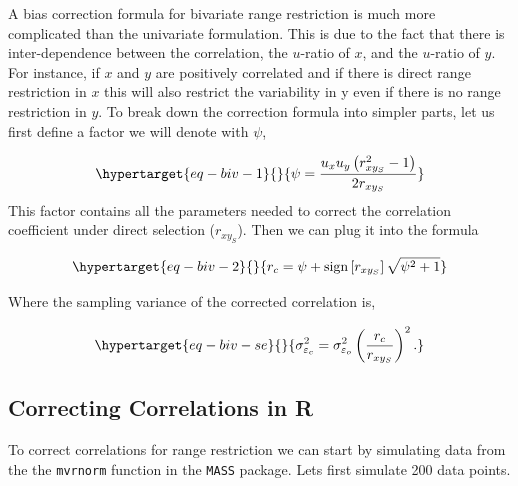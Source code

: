 \documentclass[
  letterpaper,
  DIV=11,
  numbers=noendperiod]{scrreprt}
\begin{document}
A bias correction formula for bivariate range restriction is much more
complicated than the univariate formulation. This is due to the fact
that there is inter-dependence between the correlation, the \(u\)-ratio
of \(x\), and the \(u\)-ratio of \(y\). For instance, if \(x\) and \(y\)
are positively correlated and if there is direct range restriction in
\(x\) this will also restrict the variability in y even if there is no
range restriction in \(y\). To break down the correction formula into
simpler parts, let us first define a factor we will denote with
\(\psi\),

\begin{equation}\protect\hypertarget{eq-biv-1}{}{
\psi = \frac{u_x u_y\left(r_{xy_S}^2-1\right)}{2r_{xy_S}}
}\label{eq-biv-1}\end{equation} This factor contains all the parameters
needed to correct the correlation coefficient under direct selection
(\(r_{xy_S}\)). Then we can plug it into the formula

\begin{equation}\protect\hypertarget{eq-biv-2}{}{
r_c = \psi + \text{sign}\left[r_{xy_S}\right]\sqrt{\psi^2+1}
}\label{eq-biv-2}\end{equation}

Where the sampling variance of the corrected correlation is,

\begin{equation}\protect\hypertarget{eq-biv-se}{}{
\sigma^2_{\varepsilon_c} = \sigma^2_{\varepsilon_o}\left(\frac{r_c}{r_{xy_S}}\right)^2.
}\label{eq-biv-se}\end{equation}

\hypertarget{correcting-correlations-in-r-2}{%
\subsection{Correcting Correlations in
R}\label{correcting-correlations-in-r-2}}

To correct correlations for range restriction we can start by simulating
data from the the \texttt{mvrnorm} function in the \texttt{MASS}
package. Lets first simulate 200 data points.
\end{document}

